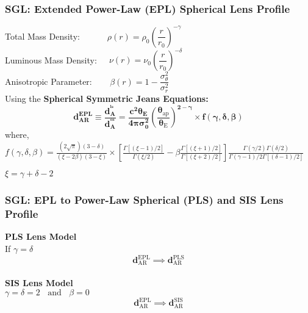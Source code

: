 \documentclass[10pt,xcolor={dvipsnames}]{beamer}
\begin{document}
\begin{frame}
 \frametitle{\textbf{SGL}: {\normalsize Extended Power-Law (EPL) Spherical Lens Profile}}
 Total Mass Density:  $~~~~~~~~~~~~~\rho(r)=\rho_{0}\left(\dfrac{r}{r_{0}}\right)^{-\gamma}$ 
\vspace{2mm}\\
 Luminous Mass Density: $~~~~~\nu(r)=\nu_{0}\left(\dfrac{r}{r_{0}}\right)^{-\delta}$
\vspace{2mm}\\
 Anisotropic Parameter: $~~~~~~~~\beta(r)=1-\dfrac{\sigma_{\theta}^{2}}{ \sigma_{r}^{2}}$
\vspace{3mm}\\
Using the \textbf{Spherical Symmetric Jeans Equations:} 
$$
{\boxed{\boldsymbol{d_{AR}^{EPL} \equiv \dfrac{d_{A}^{^{ls}}}{d_{A}^{^{os}}}=\dfrac{c^{2} \theta_{E}}{4 \pi \sigma_{0}^{2}}\left(\dfrac{\theta_{\mathrm{ap}}}{\theta_{\mathrm{E}}}\right)^{2-\gamma} \times f(\gamma, \delta, \beta)}}}
$$
 where,
 $f(\gamma, \delta, \beta)=\frac{(2 \sqrt{\pi})(3-\delta)}{(\xi-2 \beta)(3-\xi)} \times\left[\frac{\Gamma[(\xi-1) / 2]}{\Gamma(\xi / 2)}-\beta \frac{\Gamma[(\xi+1) / 2]}{\Gamma[(\xi+2) / 2]}\right] \frac{\Gamma(\gamma / 2) \Gamma(\delta / 2)}{\Gamma(\gamma-1) / 2 \Gamma[(\delta-1) / 2]}$\\
 \begin{flushright}
 $\xi=\gamma+\delta-2$
 \end{flushright}
\end{frame}
\begin{frame}
 \frametitle{{SGL}: {\normalsize \textbf{EPL} to \textbf{ Power-Law Spherical (PLS) }and \textbf{SIS} Lens Profile}}
 \textbf{ PLS Lens Model}
\vspace{2mm}\\
If $\gamma=\delta$ 
$$
{\boxed{\boldsymbol{d_{\mathrm{AR}}^{\mathrm{EPL}}\implies d_{\mathrm{AR}}^{\mathrm{PLS}}}}}
$$
\vspace{5mm}\\
 \textbf{ SIS Lens Model}
\vspace{2mm}\\
$\gamma=\delta=2~~~~\text{and}~~~~\beta=0$
$$
{\boxed{\boldsymbol{d_{\mathrm{AR}}^{\mathrm{EPL}}\implies d_{\mathrm{AR}}^{\mathrm{SIS}}}}}
$$
 \end{frame}
\end{document}

